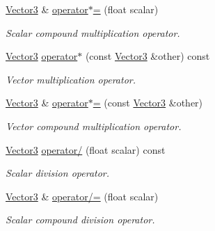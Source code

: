 \begin{DoxyCompactItemize}
\hyperlink{classchaos_1_1gfx_1_1_vector3}{Vector3} \& \hyperlink{classchaos_1_1gfx_1_1_vector3_abd751363ea77af4f9e673cf092f49473}{operator$\ast$=} (float scalar)
\begin{DoxyCompactList}\small\item\em Scalar compound multiplication operator. \end{DoxyCompactList}\item 
\hyperlink{classchaos_1_1gfx_1_1_vector3}{Vector3} \hyperlink{classchaos_1_1gfx_1_1_vector3_a8807a47431a2f3c1f8951c61cecd0023}{operator$\ast$} (const \hyperlink{classchaos_1_1gfx_1_1_vector3}{Vector3} \&other) const 
\begin{DoxyCompactList}\small\item\em Vector multiplication operator. \end{DoxyCompactList}\item 
\hyperlink{classchaos_1_1gfx_1_1_vector3}{Vector3} \& \hyperlink{classchaos_1_1gfx_1_1_vector3_a61771810dbf4a90472e2b24ca0945074}{operator$\ast$=} (const \hyperlink{classchaos_1_1gfx_1_1_vector3}{Vector3} \&other)
\begin{DoxyCompactList}\small\item\em Vector compound multiplication operator. \end{DoxyCompactList}\item 
\hyperlink{classchaos_1_1gfx_1_1_vector3}{Vector3} \hyperlink{classchaos_1_1gfx_1_1_vector3_abc909457ea9721592932f00502978886}{operator/} (float scalar) const 
\begin{DoxyCompactList}\small\item\em Scalar division operator. \end{DoxyCompactList}\item 
\hyperlink{classchaos_1_1gfx_1_1_vector3}{Vector3} \& \hyperlink{classchaos_1_1gfx_1_1_vector3_a9f61bd9beaabb1de857258d96d46c093}{operator/=} (float scalar)
\begin{DoxyCompactList}\small\item\em Scalar compound division operator. \end{DoxyCompactList}\end{DoxyCompactItemize}
